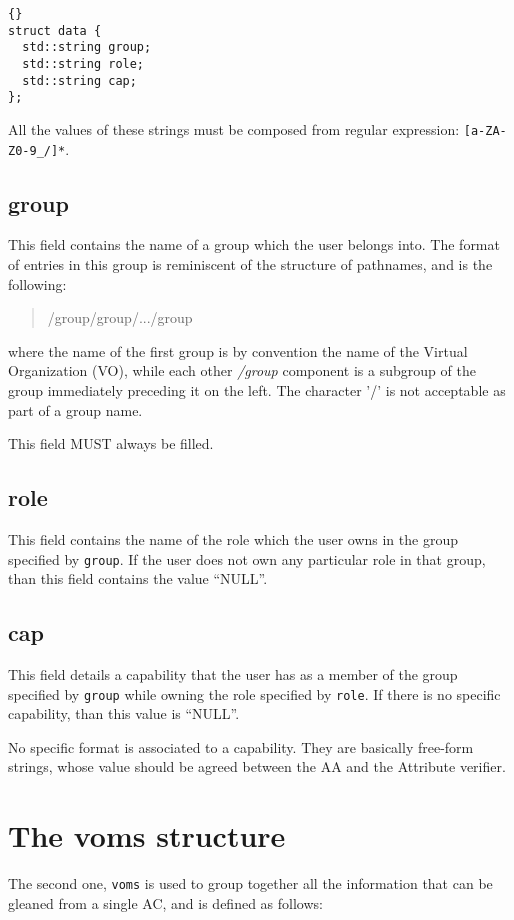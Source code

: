 \documentclass[a4paper]{book}
\begin{document}
\begin{lstlisting}{}
struct data {
  std::string group; 
  std::string role;  
  std::string cap;   
};
\end{lstlisting}

All the values of these strings must be composed from regular
expression: \texttt{[a-ZA-Z0-9\_/]*}.

\subsection{group}
This field contains the name of a group which the user belongs into.
The format of entries in this group is reminiscent of the structure of
pathnames, and is the following:
\begin{quote}
\begin{emph}
/group/group/.../group
\end{emph}
\end{quote}
where the name of the first group is by convention the name of the
Virtual Organization (VO), while each other \emph{/group} component is
a subgroup of the group immediately preceding it on the left. The
character '/' is not acceptable as part of a group name.

This field MUST always be filled.

\subsection{role}
This field contains the name of the role which the user owns in the
group specified by \texttt{group}.  If the user does not own any
particular role in that group, than this field contains the value
``NULL''.

\subsection{cap}
This field details a capability that the user has as a member of the
group specified by \texttt{group} while owning the role specified by
\texttt{role}.  If there is no specific capability, than this value is
``NULL''. 

No specific format is associated to a capability.  They are basically
free-form strings, whose value should be agreed between the AA and the
Attribute verifier.

\section{The voms structure}
The second one, \texttt{voms} is used to group together all the
information that can be gleaned from a single AC, and is defined as
follows:
\end{document}
